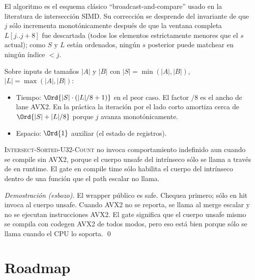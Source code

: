 El algoritmo es el esquema clásico ``broadcast-and-compare''
usado en la literatura de intersección SIMD. Su corrección se
desprende del invariante de que $j$ sólo incrementa
monotónicamente después de que la ventana completa $L[j..j+8]$
fue descartada (todos los elementos estrictamente menores que el
$s$ actual); como $S$ y $L$ están ordenados, ningún $s$ posterior
puede matchear en ningún índice $< j$.

\begin{theorem}
Sobre inputs de tamaños $|A|$ y $|B|$ con $|S| = \min(|A|, |B|)$,
$|L| = \max(|A|, |B|)$:
\begin{itemize}
    \item Tiempo: $\Ord{|S| \cdot (|L| / 8 + 1)}$ en el peor
        caso. El factor $/8$ es el ancho de lane AVX2. En la
        práctica la iteración por el lado corto amortiza cerca
        de $\Ord{|S| + |L| / 8}$ porque $j$ avanza
        monotónicamente.
    \item Espacio: $\Ord{1}$ auxiliar (el estado de registros).
\end{itemize}
\end{theorem}

\begin{theorem}
\textsc{Intersect-Sorted-U32-Count} no invoca comportamiento
indefinido aun cuando se compile sin AVX2, porque el cuerpo
unsafe del intrínseco sólo se llama a través de
 en runtime. El gate
\code{\#[target\_feature(enable = "avx2")]} en compile time sólo
habilita el cuerpo del intrínseco dentro de una función que el
path escalar no llama.
\end{theorem}

\begin{proof}[Demostración (esbozo)]
El wrapper público es safe. Chequea
 primero; sólo en hit
invoca al cuerpo unsafe. Cuando AVX2 no se reporta, se llama al
merge escalar y no se ejecutan instrucciones AVX2. El gate
 significa que el cuerpo unsafe mismo se
compila con codegen AVX2 de todos modos, pero eso está bien
porque sólo se llama cuando el CPU lo soporta. \qed
\end{proof}

\section{Roadmap}

